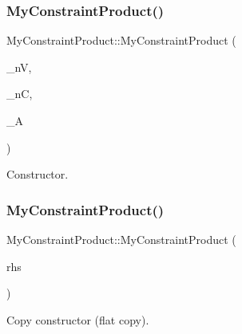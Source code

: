 \subsubsection{\texorpdfstring{My\+Constraint\+Product()}{MyConstraintProduct()}\hspace{0.1cm}{\footnotesize\ttfamily [2/3]}}
{\footnotesize\ttfamily My\+Constraint\+Product\+::\+My\+Constraint\+Product (\begin{DoxyParamCaption}\item[{\hyperlink{_types_8hpp_ab6fd6105e64ed14a0c9281326f05e623}{int\+\_\+t}}]{\+\_\+nV,  }\item[{\hyperlink{_types_8hpp_ab6fd6105e64ed14a0c9281326f05e623}{int\+\_\+t}}]{\+\_\+nC,  }\item[{\hyperlink{qp_o_a_s_e_s__wrapper_8h_a0d00e2b3dfadee81331bbb39068570c4}{real\+\_\+t} $\ast$}]{\+\_\+A }\end{DoxyParamCaption})\hspace{0.3cm}{\ttfamily [inline]}}

Constructor. \mbox{\label{class_my_constraint_product_a8713cbd57754373bb7b882b18a6dda3b}} 
\subsubsection{\texorpdfstring{My\+Constraint\+Product()}{MyConstraintProduct()}\hspace{0.1cm}{\footnotesize\ttfamily [3/3]}}
{\footnotesize\ttfamily My\+Constraint\+Product\+::\+My\+Constraint\+Product (\begin{DoxyParamCaption}\item[{const \hyperlink{class_my_constraint_product}{My\+Constraint\+Product} \&}]{rhs }\end{DoxyParamCaption})\hspace{0.3cm}{\ttfamily [inline]}}

Copy constructor (flat copy). \mbox{\label{class_my_constraint_product_a91575bc7f737462aef210acec28b322e}} 
